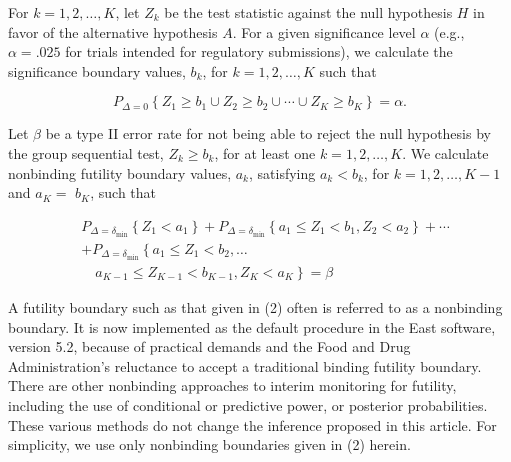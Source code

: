 \documentclass[10pt]{article}
\begin{document}
For $k=1,2, \ldots, K$, let $Z_{k}$ be the test statistic against the null hypothesis $H$ in favor of the alternative hypothesis $A$. For a given significance level $\alpha$ (e.g., $\alpha=.025$ for trials intended for regulatory submissions), we calculate the significance boundary values, $b_{k}$, for $k=1,2, \ldots, K$ such that


\begin{equation*}
P_{\Delta=0}\left\{Z_{1} \geq b_{1} \cup Z_{2} \geq b_{2} \cup \cdots \cup Z_{K} \geq b_{K}\right\}=\alpha . \tag{1}
\end{equation*}


Let $\beta$ be a type II error rate for not being able to reject the null hypothesis by the group sequential test, $Z_{k} \geq b_{k}$, for at least one $k=1,2, \ldots, K$. We calculate nonbinding futility boundary values, $a_{k}$, satisfying $a_{k}<b_{k}$, for $k=1,2, \ldots, K-1$ and $a_{K}=$ $b_{K}$, such that


\begin{align*}
& P_{\Delta=\delta_{\min }}\left\{Z_{1}<a_{1}\right\}+P_{\Delta=\delta_{\min }}\left\{a_{1} \leq Z_{1}<b_{1}, Z_{2}<a_{2}\right\}+\cdots \\
& +P_{\Delta=\delta_{\min }}\left\{a_{1} \leq Z_{1}<b_{2}, \ldots\right. \\
& \left.\quad a_{K-1} \leq Z_{K-1}<b_{K-1}, Z_{K}<a_{K}\right\}=\beta \tag{2}
\end{align*}


A futility boundary such as that given in (2) often is referred to as a nonbinding boundary. It is now implemented as the default procedure in the East software, version 5.2, because of practical demands and the Food and Drug Administration's reluctance to accept a traditional binding futility boundary. There are other nonbinding approaches to interim monitoring for futility, including the use of conditional or predictive power, or posterior probabilities. These various methods do not change the inference proposed in this article. For simplicity, we use only nonbinding boundaries given in (2) herein.
\end{document}
